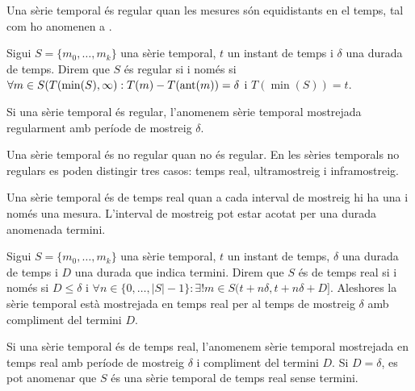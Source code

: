 Una sèrie temporal és regular quan les mesures són equidistants en el temps, tal com ho anomenen a \cite{last:hetland}.

\begin{definition}
  Sigui $S=\{m_0,\ldots,m_k\}$ una sèrie temporal, $t$ un instant de
  temps i $\delta$ una durada de temps. Direm que $S$ és regular si i
  només si $\forall m \in S(T(\min(S),\infty):T(m) - T(\operatorname*{ant}(m)) = \delta$ i
  $T(\min(S))=t$. 
\end{definition}

Si una sèrie temporal és regular, l'anomenem  sèrie temporal mostrejada
regularment amb període de mostreig $\delta$.


Una sèrie temporal és no regular quan no és regular. 
En les sèries temporals no regulars es poden distingir tres casos: temps real, ultramostreig i inframostreig.

Una sèrie temporal és de temps real quan a cada interval de mostreig hi ha una i només una mesura. L'interval de mostreig pot estar acotat per una durada anomenada termini.

\begin{definition}
  Sigui $S=\{m_0,\dotsc,m_k\}$ una sèrie temporal, $t$ un instant de
  temps, $\delta$ una durada de temps i $D$ una durada que indica
  termini. Direm que $S$ és de temps real si i només si $D\leq\delta$
  i $\forall n\in\{0,\ldots,|S|-1\}: \exists!m \in
  S(t+n\delta,t+n\delta+D]$.  Aleshores la sèrie temporal està
  mostrejada en temps real per al temps de mostreig $\delta$ amb
  compliment del termini $D$.
\end{definition}

Si una sèrie temporal és de temps real, l'anomenem  sèrie temporal mostrejada
en temps real amb període de mostreig $\delta$ i compliment del termini $D$.
Si $D=\delta$, es pot anomenar que $S$ és una sèrie temporal de temps real sense termini.




